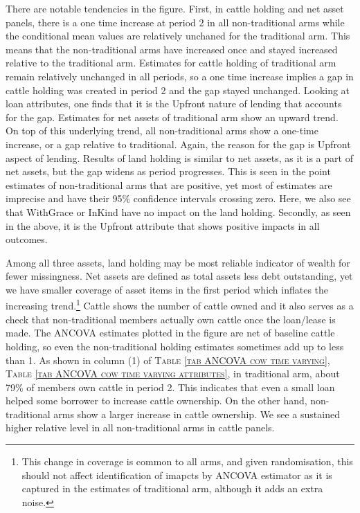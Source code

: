 	There are notable tendencies in the figure. First, in cattle holding and net asset panels, there is a one time increase at period 2 in all non-\textsf{traditional} arms while the conditional mean values are relatively unchaned for the \textsf{traditional} arm. This means that the non-\textsf{traditional} arms have increased once and stayed increased relative to the \textsf{traditional} arm. Estimates for cattle holding of \textsf{traditional} arm remain relatively unchanged in all periods, so a one time increase implies a gap in cattle holding was created in period 2 and the gap stayed unchanged. Looking at loan attributes, one finds that it is the \textsf{Upfront} nature of lending that accounts for the gap. Estimates for net assets of \textsf{traditional} arm show an upward trend. On top of this underlying trend, all non-\textsf{traditional} arms show a one-time increase, or a gap relative to \textsf{traditional}. Again, the reason for the gap is \textsf{Upfront} aspect of lending. Results of land holding is similar to net assets, as it is a part of net assets, but the gap widens as period progresses. This is seen in the point estimates of non-\textsf{traditional} arms that are positive, yet most of estimates are imprecise and have their 95\% confidence intervals crossing zero. Here, we also see that \textsf{WithGrace} or \textsf{InKind} have no impact on the land holding. Secondly, as seen in the above, it is the \textsf{Upfront} attribute that shows positive impacts in all outcomes. 

	Among all three assets, land holding may be most reliable indicator of wealth for fewer missingness. Net assets are defined as total assets less debt outstanding, yet we have smaller coverage of asset items in the first period which inflates the increasing trend.\footnote{This change in coverage is common to all arms, and given randomisation, this should not affect identification of imapcts by ANCOVA estimator as it is captured in the estimates of \textsf{traditional} arm, although it adds an extra noise. } Cattle shows the number of cattle owned and it also serves as a check that non-\textsf{traditional} members actually own cattle once the loan/lease is made. The ANCOVA estimates plotted in the figure are net of baseline cattle holding, so even the non-\textsf{traditional} holding estimates sometimes add up to less than 1. As shown in column (1) of \textsc{\normalsize Table \ref{tab ANCOVA cow time varying}}, \textsc{\normalsize Table \ref{tab ANCOVA cow time varying attributes}}, in \textsf{traditional} arm, about 79\% of members own cattle in period 2. This indicates that even a small loan helped some borrower to increase cattle ownership. On the other hand, non-\textsf{traditional} arms show a larger increase in cattle ownership. We see a sustained higher relative level in all non-\textsf{traditional} arms in \textsf{cattle} panels. 


